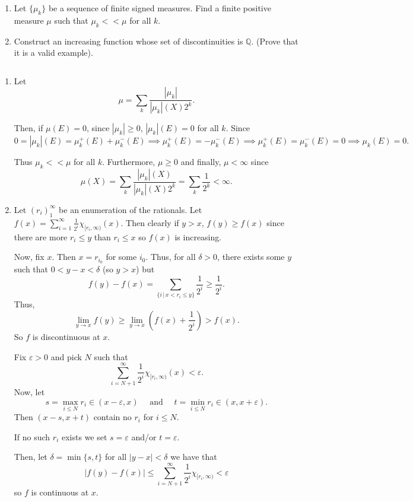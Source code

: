 \documentclass[12pt]{Qual}
\begin{document}
\begin{problem} $\,$
\begin{enumerate}[label=(\alph*)]
    \item Let $\{\mu_k\}$ be a sequence of finite signed measures. Find a finite positive measure $\mu$ such that $\mu_k<<\mu$ for all $k$.
    \item Construct an increasing function whose set of discontinuities is $\mathbb{Q}$. (Prove that it is a valid example).
\end{enumerate}
\end{problem}


\begin{solution}$\,$
\begin{enumerate}[label=(\alph*)]
    \item Let $$\mu=\sum_k\frac{|\mu_k|}{|\mu_k|(X)2^k}.$$

    Then, if $\mu(E)=0$, since $|\mu_k|\ge0$, $|\mu_k|(E)=0$ for all $k$. Since $$0=|\mu_k|(E)=\mu_k^+(E)+\mu_k^-(E)\implies \mu_k^+(E)=-\mu_k^-(E)\implies \mu_k^+(E)=\mu_k^-(E)=0\implies\mu_k(E)=0.$$

    Thus $\mu_k<<\mu$ for all $k$. Furthermore, $\mu\ge0$ and finally, $\mu<\infty$ since $$\mu(X)=\sum_k\frac{|\mu_k|(X)}{|\mu_k|(X)2^k}=\sum_k\frac{1}{2^k}<\infty.$$
    \item Let $(r_i)_1^\infty$ be an enumeration of the rationals. Let $f(x)=\sum_{i=1}^\infty\frac{1}{2^i}\chi_{[r_i,\infty)}(x).$ Then clearly if $y>x$, $f(y)\ge f(x)$ since there are more $r_i\le y$  than $r_i\le x$ so $f(x)$ is increasing.

    Now, fix $x$.
     Then $x=r_{i_0}$ for some $i_0$. Thus, for all $\delta>0$, there exists some $y$ such that $0<y-x<\delta$ (so $y>x$) but $$f(y)-f(x)=\sum_{\{i\,|\,x<r_i\le y\}}\frac{1}{2^i}\ge\frac{1}{2^i}.$$ Thus, $$\lim_{y\to x}f(y)\ge \lim_{y\to x}\left(f(x)+\frac{1}{2^i}\right)>f(x).$$ So $f$ is discontinuous at $x$.

     Fix $\varepsilon>0$ and pick $N$ such that $$\sum_{i=N+1}^\infty\frac{1}{2^i}\chi_{[r_i,\infty)}(x)<\varepsilon.$$ Now, let $$s=\max_{i\le N}r_i\in(x-\varepsilon,x)\quad\text{ and }\quad t=\min_{i\le N}r_i\in(x,x+\varepsilon).$$ Then $(x-s,x+t)$ contain no $r_i$ for $i\le N$.

    If no such $r_i$ exists we set $s=\varepsilon$ and/or $t=\varepsilon$.

    Then, let $\delta=\min\{s,t\}$ for all $|y-x|<\delta$ we have that $$|f(y)-f(x)|\le\sum_{i=N+1}^\infty\frac{1}{2^i}\chi_{[r_i,\infty)}<\varepsilon$$ so $f$ is continuous at $x.$
\end{enumerate}
\end{solution}
\newpage
\end{document}
